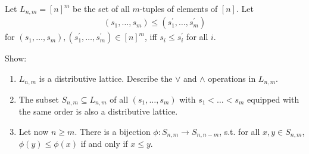 \begin{problem}
  Let $L_{n,m} = [n]^{m}$ be the set of all $m$-tuples of elements of $[n]$. Let
  \begin{align*}
    (s_{1}, \ldots, s_{m}) \leq (s_{1}^{'}, \ldots, s_{m}^{'})
  \end{align*}
  for $(s_{1}, \ldots, s_{m}), (s_{1}^{'}, \ldots, s_{m}^{'}) \in [n]^{m}$, iff $s_{i} \leq s_{i}^{'}$ for all $i$.

  Show:
  \begin{enumerate}[label=(\roman*)]
    \item $L_{n,m}$ is a distributive lattice. Describe the $\vee$ and $\wedge$ operations in $L_{n,m}$.
    \item The subset $S_{n,m} \subseteq L_{n,m}$ of all $(s_{1}, \ldots, s_{m})$ with $s_{1} < \ldots < s_{m}$ equipped with the same order is also a distributive lattice.
    \item Let now $n \geq m$. There is a bijection $\phi : S_{n,m} \to S_{n, n-m}$, s.t. for all $x,y \in S_{n,m}$, $\phi(y) \leq \phi(x)$ if and only if $x \leq y$.
  \end{enumerate}
\end{problem}
